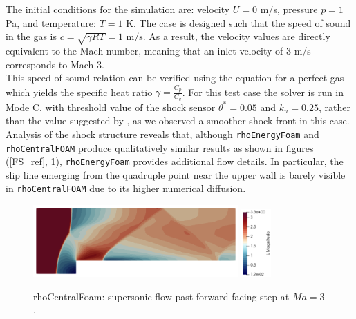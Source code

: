 \documentclass[a5paper]{sapthesis}
\begin{document}
	\noindent The initial conditions for the simulation are: velocity  $U = 0$ m/s, pressure $p = 1$ Pa, and temperature: $T = 1$ K. The case is designed such that the speed of sound in the gas is	$c = \sqrt{\gamma R T} = 1 \text{ m/s}$. As a result, the velocity values are directly equivalent to the Mach number, meaning that an inlet velocity of 3 m/s corresponds to Mach 3.
	\\
	This speed of sound relation can be verified using the equation for a perfect gas which yields the specific heat ratio $\gamma = \frac{C_p}{C_v}$. 
	For this test case the solver is run in Mode C, with threshold
	value of the shock sensor $\theta^* = 0.05$ and $k_u = 0.25$, rather than the value suggested by \citet{LIOU_AUSM+-up}, as we observed a smoother shock front in this case.
	Analysis of the shock structure reveals that, although \texttt{rhoEnergyFoam} and \texttt{rhoCentralFOAM} produce qualitatively similar results as shown in figures (\ref{FS_ref}, \ref{FS_rcf}), \texttt{rhoEnergyFoam} provides additional flow details. In particular, the slip line emerging from the quadruple point near the upper wall is barely visible in \texttt{rhoCentralFOAM} due to its higher numerical diffusion.
	
	\begin{figure}[h]
		\centering
		\subfloat
		{\includegraphics[width=0.7\textwidth]{Figures/FS_rcf}} \quad 
		\subfloat
		\centering
		{\includegraphics[width=0.1\textwidth, height=0.16\textheight]{Figures/FS_velocitybar}}
		\caption{rhoCentralFoam: supersonic ﬂow past forward-facing step at $Ma = 3$.}
		\label{FS_rcf}
	\end{figure}
	
\end{document}
